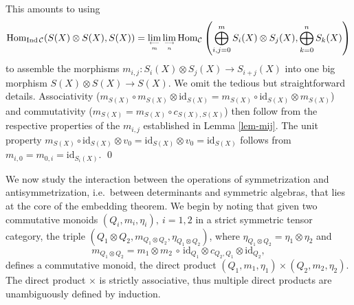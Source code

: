 \documentclass[11pt]{article}
\theoremstyle{definition}
\theoremstyle{definition}
\theoremstyle{remark}
\def\2#1{{\mathcal #1}}
\newcommand{\Hom}{\mathrm{Hom}}
\newcommand{\mcirc}{\,\circ\,}
\newcommand{\rarr}{\rightarrow}
\def\id{\mathrm{id}}
\begin{document}
\prf
This amounts to using
\[ \Hom_{\mathrm{Ind}\,\2C} (S(X)\otimes S(X),S(X))
   =\lim_{\longleftarrow\atop m}\lim_{\longrightarrow\atop n}
   \Hom_\2C\left(\bigoplus_{i,j=0}^m S_i(X)\otimes S_j(X),\bigoplus_{k=0}^n S_k(X)\right) \]
to assemble the morphisms $m_{i,j}: S_i(X)\otimes S_j(X)\rarr S_{i+j}(X)$ into one big 
morphism $S(X)\otimes S(X)\rarr S(X)$. 
We omit the tedious but straightforward details. Associativity
($m_{S(X)}\circ m_{S(X)}\otimes\id_{S(X)}=m_{S(X)}\circ\id_{S(X)}\otimes m_{S(X)}$) and
commutativity ($m_{S(X)}=m_{S(X)}\circ c_{S(X),S(X)}$) then follow  from the respective properties
of the $m_{i,j}$ established in Lemma \ref{lem-mij}. The unit property 
$m_{S(X)}\circ\id_{S(X)}\otimes v_0=\id_{S(X)}\otimes v_0=\id_{S(X)}$ follows from
$m_{i,0}=m_{0,i}=\id_{S_i(X)}$. 
\qed




We now study the interaction between the operations of symmetrization and antisymmetrization, i.e.\
between determinants and symmetric algebras, that lies at the core of the embedding theorem. We begin 
by noting that given two commutative monoids $(Q_i,m_i,\eta_i),\ i=1,2$ in a strict symmetric tensor
category, the triple $(Q_1\otimes Q_2,m_{Q_1\otimes   Q_2}, \eta_{Q_1\otimes Q_2})$, where 
$\eta_{Q_1\otimes Q_2}=\eta_1\otimes\eta_2$ and
\[ m_{Q_1\otimes Q_2}=m_1\otimes m_2\mcirc \id_{Q_1}\otimes c_{Q_2,Q_1}\otimes\id_{Q_2}, \]
defines a commutative monoid, the direct product $(Q_1,m_1,\eta_1)\times(Q_2,m_2,\eta_2)$.
The direct product $\times$ is strictly associative, thus multiple direct products are unambiguously 
defined by induction.
\end{document}
